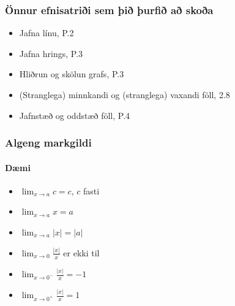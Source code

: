 \documentclass[icelandic,a4paper,12pt]{article}
\begin{document}
% 
% 



\subsubsection*{Önnur efnisatriði sem þið þurfið að skoða}

\begin{itemize}
\item Jafna línu, P.2
\item Jafna hrings, P.3
 \item Hliðrun og skölun grafs, P.3
 \item (Stranglega) minnkandi og (stranglega) vaxandi föll, 2.8
 \item Jafnstæð og oddstæð föll, P.4
\end{itemize}

 


\date{3.~september 2012}

\maketitle


\subsubsection*{Algeng markgildi}
\paragraph{Dæmi}
	\begin{itemize}
	\item $\lim_{x \to a} c = c$, $c$ fasti
	\pause
	\item $\lim_{x \to a} x = a$
	\item $\lim_{x \to a} |x| = |a|$
	\pause
	\item $\lim_{x \to 0} \frac{|x|}{x}$ er ekki til
	\pause
	\item $\lim_{x \to 0^-} \frac{|x|}{x} = -1$
	\item $\lim_{x \to 0^+} \frac{|x|}{x} = 1$
	\end{itemize}
\end{document}
